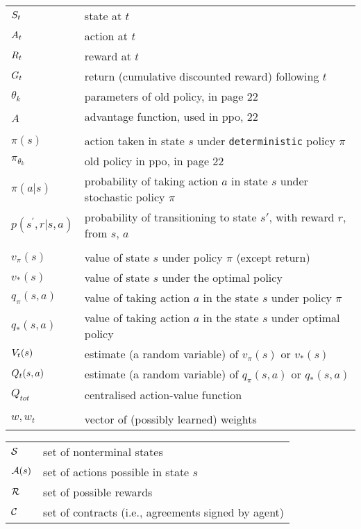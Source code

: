 \begin{tabular}{p{1.6cm} p{12cm}}
$S_t$  & state at $t$ \\
$A_t$  & action at $t$ \\
$R_t$  & reward at $t$ \\
$G_t$  & return (cumulative discounted reward) following $t$ \\
$\theta_{k}$ & parameters of old policy, in page 22 \\
$\hat{A}$ & advantage function, used in ppo, 22\\

\\
$\pi(s)$  & action taken in state $s$ under \texttt{deterministic} policy $\pi$ \\
$\pi_{\theta_{k}}$ & old policy in ppo, in page 22 \\
$\pi(a|s)$  & probability of taking action $a$ in state $s$ under stochastic policy $\pi$ \\
$p(s^{\prime},r|s,a)$  & probability of transitioning to state $s'$, with reward $r$, from $s$, $a$ \\
\\
$v_\pi(s)$ & value of state $s$ under policy $\pi$ (except return) \\
$v_*(s)$ & value of state $s$ under the optimal policy \\
$q_{\pi}(s, a)$ & value of taking action $a$ in the state $s$ under policy $\pi$ \\
$q_{*}(s, a)$ & value of taking action $a$ in the state $s$ under optimal policy \\
$V_{t}(s)$ & estimate (a random variable) of $v_{\pi}(s)$ or $v_{*}(s)$ \\ 
$Q_{t}(s, a)$ & estimate (a random variable) of $q_{\pi}(s, a)$ or $q_{*}(s, a)$ \\
$Q_{tot}$ &  centralised action-value function \\
\\
$w, w_{t}$ & vector of (possibly learned) weights \\


\end{tabular}


\begin{tabular}{p{1.5cm} p{12cm}}
$\mathcal{S}$ & set of nonterminal states \\
$\mathcal{A}(s)$ & set of actions possible in state $s$ \\
$\mathcal{R}$ & set of possible rewards \\
$\mathcal{C}$ & set of contracts (i.e., agreements signed by agent) \\
\end{tabular}